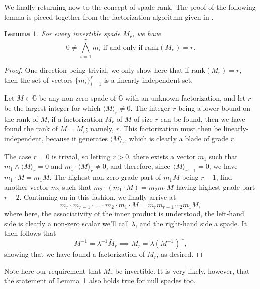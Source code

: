 \documentclass{birkjour}
\newtheorem{lem}[thm]{Lemma}
\theoremstyle{definition}
\theoremstyle{remark}
\numberwithin{equation}{section}
\newcommand{\G}{\mathbb{G}}
\newcommand{\rank}{\mbox{rank}}
\begin{document}
We finally returning now to the concept of spade rank.  The proof of the following lemma is pieced together
from the factorization algorithm given in \cite[p. 108]{Perwass09}.
\begin{lem}\label{lem_spade_rank_iff_lin_indep}
For every invertible spade $M_r$, we have
\begin{equation*}
\mbox{$0\neq\bigwedge_{i=1}^r m_i$ if and only if $\rank(M_r)=r$.}
\end{equation*}
\end{lem}
\begin{proof}
One direction being trivial, we only show here that if $\rank(M_r)=r$, then
the set of vectors $\{m_i\}_{i=1}^r$ is a linearly independent set.

Let $M\in\G$ be any non-zero spade of $\G$ with an unknown factorization,
and let $r$ be the largest integer for which $\langle M\rangle_r\neq 0$.
The integer $r$ being a lower-bound on the rank of $M$, if a factorization $M_r$
of $M$ of size $r$ can be found, then we have found the rank of $M=M_r$; namely, $r$.
This factorization must then be linearly-independent, because it generates $\langle M\rangle_r$,
which is clearly a blade of grade $r$.

The case $r=0$ is trivial, so letting $r>0$,
there exists a vector $m_1$ such that $m_1\wedge\langle M\rangle_r=0$
and $m_1\cdot\langle M\rangle_r\neq 0$, and therefore, since $\langle M\rangle_{r-1}=0$,
we have $m_1\cdot M = m_1M$.  The highest non-zero grade part of $m_1M$ being $r-1$,
find another vector $m_2$ such that $m_2\cdot(m_1\cdot M)=m_2m_1M$ having highest grade
part $r-2$.  Continuing on in this fashion,
we finally arrive at
\begin{equation*}
m_r\cdot m_{r-1}\cdot\dots\cdot m_2\cdot m_1\cdot M=m_rm_{r-1}\dotsm_2m_1M,
\end{equation*}
where here, the associativity of the inner product is understood, the left-hand side is clearly a non-zero scalar we'll call $\lambda$,
and the right-hand side a spade.  It then follows that
\begin{equation*}
M^{-1} = \lambda^{-1}\tilde{M_r}\implies M_r = \lambda(M^{-1})^{\sim},
\end{equation*}
showing that we have found a factorization of $M_r$, as desired.
\end{proof}
Note here our requirement that $M_r$ be invertible.  It is very likely, however,
that the statement of Lemma~\ref{lem_spade_rank_iff_lin_indep} also holds true for null spades too.
\end{document}
